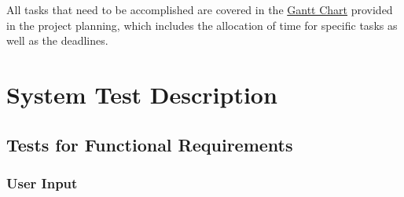 \documentclass[12pt, titlepage]{article}
\begin{document}
All tasks that need to be accomplished are covered in the \href{https://gitlab.cas.mcmaster.ca/balacs1/se3xa3-project/-/tree/master/ProjectSchedule}{Gantt Chart} provided in the project planning, which includes the allocation of time for specific tasks as well as the deadlines.
		
\section{System Test Description}
	
\subsection{Tests for Functional Requirements}

\subsubsection{User Input}
		
\end{document}
